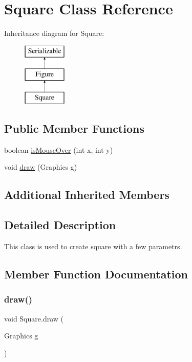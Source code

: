 \hypertarget{class_square}{}\section{Square Class Reference}
\label{class_square}
Inheritance diagram for Square\+:\begin{figure}[H]
\begin{center}
\leavevmode
\includegraphics[height=3.000000cm]{class_square}
\end{center}
\end{figure}
\subsection*{Public Member Functions}
\begin{DoxyCompactItemize}
\item 
boolean \mbox{\hyperlink{class_square_a3b0c67c06fbcb2b6f84699004f5ef0d6}{is\+Mouse\+Over}} (int x, int y)
\item 
void \mbox{\hyperlink{class_square_ab19c658492b424933f7faeb5dbed8f3c}{draw}} (Graphics g)
\end{DoxyCompactItemize}
\subsection*{Additional Inherited Members}


\subsection{Detailed Description}
This class is used to create square with a few parametrs. 

\subsection{Member Function Documentation}
\mbox{\label{class_square_ab19c658492b424933f7faeb5dbed8f3c}} 
\subsubsection{\texorpdfstring{draw()}{draw()}}
{\footnotesize\ttfamily void Square.\+draw (\begin{DoxyParamCaption}\item[{Graphics}]{g }\end{DoxyParamCaption})}

